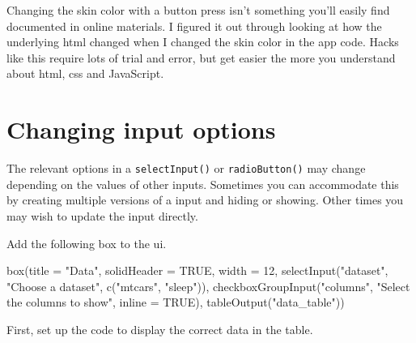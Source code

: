 \documentclass[
  oneside]{book}
\newenvironment{Shaded}{\begin{snugshade}}{\end{snugshade}}
\newcommand{\AttributeTok}[1]{\textcolor[rgb]{0.77,0.63,0.00}{#1}}
\newcommand{\ConstantTok}[1]{\textcolor[rgb]{0.00,0.00,0.00}{#1}}
\newcommand{\DecValTok}[1]{\textcolor[rgb]{0.00,0.00,0.81}{#1}}
\newcommand{\FunctionTok}[1]{\textcolor[rgb]{0.00,0.00,0.00}{#1}}
\newcommand{\NormalTok}[1]{#1}
\newcommand{\OtherTok}[1]{\textcolor[rgb]{0.56,0.35,0.01}{#1}}
\newcommand{\SpecialCharTok}[1]{\textcolor[rgb]{0.00,0.00,0.00}{#1}}
\newcommand{\StringTok}[1]{\textcolor[rgb]{0.31,0.60,0.02}{#1}}
\begin{document}
\begin{info}
Changing the skin color with a button press isn't something you'll easily find documented in online materials. I figured it out through looking at how the underlying html changed when I changed the skin color in the app code. Hacks like this require lots of trial and error, but get easier the more you understand about html, css and JavaScript.

\end{info}

\hypertarget{changing-input-options}{%
\section{Changing input options}\label{changing-input-options}}

The relevant options in a \texttt{selectInput}\texttt{()} or \texttt{radioButton}\texttt{()} may change depending on the values of other inputs. Sometimes you can accommodate this by creating multiple versions of a input and hiding or showing. Other times you may wish to update the input directly.

Add the following box to the ui.

\begin{Shaded}
\begin{Highlighting}[]
\FunctionTok{box}\NormalTok{(}\AttributeTok{title =} \StringTok{"Data"}\NormalTok{, }\AttributeTok{solidHeader =} \ConstantTok{TRUE}\NormalTok{, }\AttributeTok{width =} \DecValTok{12}\NormalTok{, }\FunctionTok{selectInput}\NormalTok{(}\StringTok{"dataset"}\NormalTok{, }\StringTok{"Choose a dataset"}\NormalTok{,}
    \FunctionTok{c}\NormalTok{(}\StringTok{"mtcars"}\NormalTok{, }\StringTok{"sleep"}\NormalTok{)), }\FunctionTok{checkboxGroupInput}\NormalTok{(}\StringTok{"columns"}\NormalTok{, }\StringTok{"Select the columns to show"}\NormalTok{,}
    \AttributeTok{inline =} \ConstantTok{TRUE}\NormalTok{), }\FunctionTok{tableOutput}\NormalTok{(}\StringTok{"data\_table"}\NormalTok{))}
\end{Highlighting}
\end{Shaded}

First, set up the code to display the correct data in the table.

\begin{Shaded}
\end{Shaded}
\end{document}
